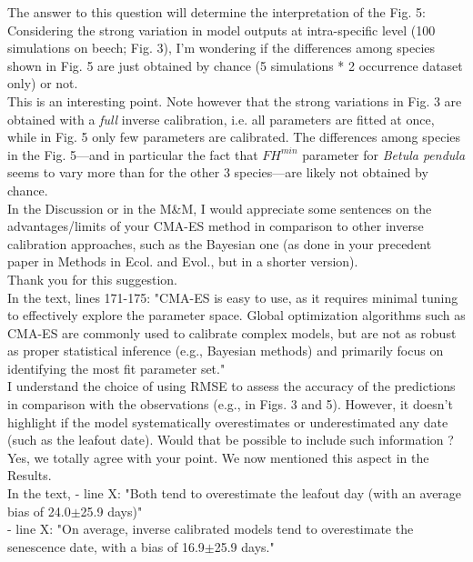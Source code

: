\documentclass[a4paper, 11pt]{article}
\begin{document}
\noindent The answer to this question will determine the interpretation of the Fig. 5: Considering the strong variation in model outputs at intra-specific level (100 simulations on beech; Fig. 3), I'm wondering if the differences among species shown in Fig. 5 are just obtained by chance (5 simulations * 2 occurrence dataset only) or not.\\
\textcolor{customblue}{This is an interesting point. Note however that the strong variations in Fig. 3 are obtained with a \emph{full} inverse calibration, i.e. all parameters are fitted at once, while in Fig. 5 only few parameters are calibrated. The differences among species in the Fig. 5---and in particular the fact that $FH^{min}$ parameter for \emph{Betula pendula} seems to vary more than for the other 3 species---are likely not obtained by chance.}\\

\noindent In the Discussion or in the M\&M, I would appreciate some sentences on the advantages/limits of your CMA-ES method in comparison to other inverse calibration approaches, such as the Bayesian one (as done in your precedent paper in Methods in Ecol. and Evol., but in a shorter version).\\
\textcolor{customblue}{Thank you for this suggestion.}\\
In the text, lines 171-175: \textcolor{customred}{"CMA-ES is easy to use, as it requires minimal tuning to effectively explore the parameter space. Global optimization algorithms such as CMA-ES are commonly used to calibrate complex models, but are not as robust as proper statistical inference (e.g., Bayesian methods) and primarily focus on identifying the most fit parameter set."}\\ 

\noindent I understand the choice of using RMSE to assess the accuracy of the predictions in comparison with the observations (e.g., in Figs. 3 and 5). However, it doesn't highlight if the model systematically overestimates or underestimated any date (such as the leafout date). Would that be possible to include such information ?\\
\textcolor{customblue}{Yes, we totally agree with your point.  We now mentioned this aspect in the Results.}\\
In the text, 
- line X: \textcolor{customred}{"Both tend to overestimate the leafout day (with an average bias of 24.0$\pm$25.9 days)"}\\ 
- line X: \textcolor{customred}{"On average, inverse calibrated models tend to overestimate the senescence date, with a bias of 16.9$\pm$25.9 days."}\\ 
\end{document}
